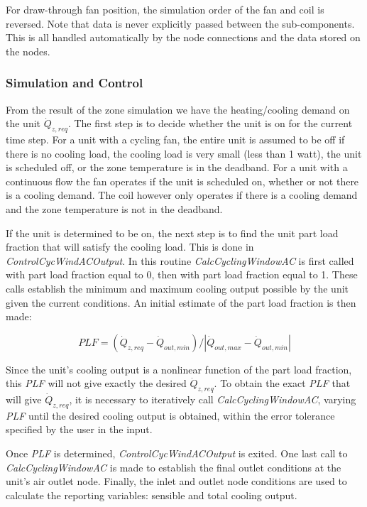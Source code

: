 For draw-through fan position, the simulation order of the fan and coil is reversed. Note that data is never explicitly passed between the sub-components. This is all handled automatically by the node connections and the data stored on the nodes.

\subsubsection{Simulation and Control}\label{simulation-and-control-4-000}

From the result of the zone simulation we have the heating/cooling demand on the unit \({\dot Q_{z,req}}\). The first step is to decide whether the unit is on for the current time step. For a unit with a cycling fan, the entire unit is assumed to be off if there is no cooling load, the cooling load is very small (less than 1 watt), the unit is scheduled off, or the zone temperature is in the deadband. For a unit with a continuous flow the fan operates if the unit is scheduled on, whether or not there is a cooling demand. The coil however only operates if there is a cooling demand and the zone temperature is not in the deadband.

If the unit is determined to be on, the next step is to find the unit part load fraction that will satisfy the cooling load. This is done in \emph{ControlCycWindACOutput}. In this routine \emph{CalcCyclingWindowAC} is first called with part load fraction equal to 0, then with part load fraction equal to 1. These calls establish the minimum and maximum cooling output possible by the unit given the current conditions. An initial estimate of the part load fraction is then made:

\begin{equation}
PLF = ({\dot Q_{z,req}} - {\dot Q_{out,min}})/|{\dot Q_{out,max}} - {\dot Q_{out,min}}|
\end{equation}

Since the unit's cooling output is a nonlinear function of the part load fraction, this \emph{PLF} will not give exactly the desired \({\dot Q_{z,req}}\). To obtain the exact \emph{PLF} that will give \({\dot Q_{z,req}}\), it is necessary to iteratively call \emph{CalcCyclingWindowAC}, varying \emph{PLF} until the desired cooling output is obtained, within the error tolerance specified by the user in the input.

Once \emph{PLF} is determined, \emph{ControlCycWindACOutput} is exited. One last call to \emph{CalcCyclingWindowAC} is made to establish the final outlet conditions at the unit's air outlet node. Finally, the inlet and outlet node conditions are used to calculate the reporting variables: sensible and total cooling output.

